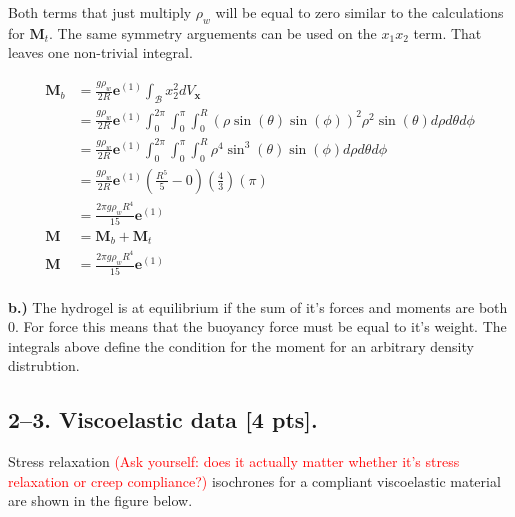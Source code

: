 Both terms that just multiply $\rho_w$ will be equal to zero similar to the calculations for $\mathbf{M}_t$. The same symmetry arguements can be used on the $x_1x_2$ term. That leaves one non-trivial integral. 

\begin{align*}
    \mathbf{M}_b &= \frac{g\rho_w}{2R} \mathbf{e}^{(1)} \int_\mathcal{B}x_2^2 dV_\mathbf{x} \\
    &= \frac{g\rho_w}{2R} \mathbf{e}^{(1)} \int_0^{2\pi}\int_0^\pi\int_0^R (\rho\sin(\theta)\sin(\phi))^2\rho^2\sin(\theta)d\rho d\theta d\phi \\
    &= \frac{g\rho_w}{2R} \mathbf{e}^{(1)} \int_0^{2\pi}\int_0^\pi\int_0^R \rho^4\sin^3(\theta)\sin(\phi)d\rho d\theta d\phi \\
    &= \frac{g\rho_w}{2R} \mathbf{e}^{(1)}\left(\frac{R^5}{5}-0\right)\left(\frac{4}{3}\right)(\pi) \\
    &= \frac{2\pi g\rho_wR^4}{15} \mathbf{e}^{(1)} \\
    \mathbf{M} &= \mathbf{M}_b + \mathbf{M}_t \\
    \mathbf{M} &= \frac{2\pi g\rho_wR^4}{15} \mathbf{e}^{(1)} \\
\end{align*}

\textbf{b.)} The hydrogel is at equilibrium if the sum of it's forces and moments are both 0. For force this means that the buoyancy force must be equal to it's weight. The integrals above define the condition for the moment for an arbitrary density distrubtion. 


\bigskip
\subsection*{2--3. \textbf{Viscoelastic data} [4 pts].} 
Stress relaxation \textcolor{red}{(Ask yourself: does it actually matter whether it's stress relaxation or creep compliance?)} isochrones for a compliant viscoelastic material are shown in the figure below.  

